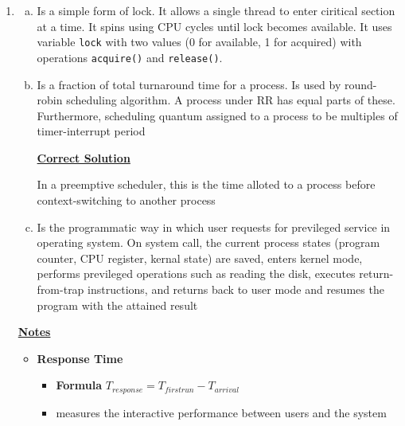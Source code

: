 \documentclass[12pt]{article}
\begin{document}
\begin{enumerate}[1.]
    \item

    \begin{enumerate}[a)]
        \item Is a simple form of lock. It allows a single thread to enter ciritical section at a time. It
        spins using CPU cycles until lock becomes available. It uses variable \texttt{lock} with two values (0 for available, 1 for acquired) with
        operations \texttt{acquire()} and \texttt{release()}.
        \item Is a fraction of total turnaround time for a process. Is used by round-robin
        scheduling algorithm. A process under RR has equal parts of these. Furthermore, scheduling quantum
        assigned to a process to be multiples of timer-interrupt period

        \bigskip

        \begin{mdframed}
        \underline{\textbf{Correct Solution}}

        \bigskip

        \color{red}In a preemptive scheduler, this is the time alloted to a process before context-switching
        to another process\color{black}
        \end{mdframed}

        \item Is the programmatic way in which user requests for previleged service in operating system.
        On system call, the current process states (program counter, CPU register, kernal state) are saved,
        enters kernel mode, performs previleged operations such as reading the disk,
        executes return-from-trap instructions, and returns back to user mode and resumes
        the program with the attained result
    \end{enumerate}

    \bigskip

    \underline{\textbf{Notes}}

    \begin{itemize}
        \item \textbf{Response Time}
        \begin{itemize}
            \item \textbf{Formula} $T_{response} = T_{firstrun} - T_{arrival}$
            \item measures the interactive performance between users and the system
        \end{itemize}


\end{itemize}
\end{enumerate}
\end{document}
